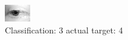 \begin{figure}[h!]
\begin{center}
\includegraphics[width=0.60\columnwidth]{figures/ID2619_class_3_target_4.png}
\end{center}
\caption{ Classification: 3 actual target: 4}
\label{fig:ID2619_class_3_target_4}
\end{figure}
